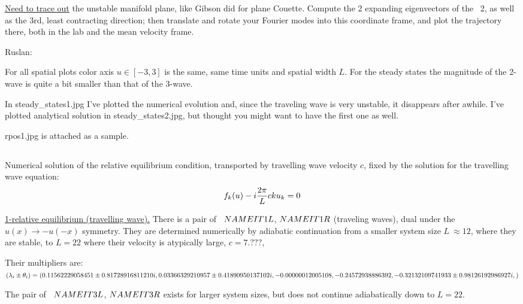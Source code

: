 \underline{Need to trace out}
the unstable manifold plane, like Gibson did for plane Couette.
Compute the 2 expanding eigenvectors of the
\eqv\ {\nameit}2, as well as the 3rd, least contracting direction; then
translate and rotate your Fourier modes into this coordinate frame,
and plot the trajectory there, both in the lab and the mean velocity frame.

Ruslan: %
% 

For all spatial plots color axis $u \in [-3, 3]$ is the same,
same time units and spatial width $L$.
For the steady states the magnitude of the 2-wave is quite 
a bit smaller than that of the 3-wave.

In steady\_states1.jpg I've plotted the numerical evolution and, since the
traveling wave is very unstable, it disappears after awhile. I've plotted
analytical solution in steady\_states2.jpg, but thought you might want to
have the first one as well.

rpos1.jpg is attached as a sample. 

\subsection{\Reqva}

Numerical solution of the relative equilibrium condition,
transported by travelling wave velocity $c$, 
fixed by the solution for the travelling wave equation:
\[
f_k(u) - i{2\pi\over L} c k u_k = 0
\]

\underline{1-relative equilibrium (travelling wave).}
There is a pair of \Reqva\ 
${NAMEIT}1L$,
${NAMEIT}1R$
(traveling waves), dual under the
$u(x) \to -u(-x)$ symmetry. They are 
determined numerically by 
adiabatic continuation from a smaller system size
$L~\approx 12$,
where they are stable, to $L=22$
where their velocity is atypically large, $c=7.???$,

Their multipliers are:
$(\lambda_i \pm \theta_i)=
(
  0.11562229058451 \pm 0.81728916811210i,
  0.03366329210957 \pm 0.41890950137102i,
 -0.00000012005108                    ,
 -0.24572938886392                    ,
 -0.32132109741933 \pm 0.98126192986927i,
)$


The pair of \Reqva\ 
${NAMEIT}3L$,
${NAMEIT}3R$
exists for larger system sizes, but does not continue 
adiabatically down to $L=22$.

